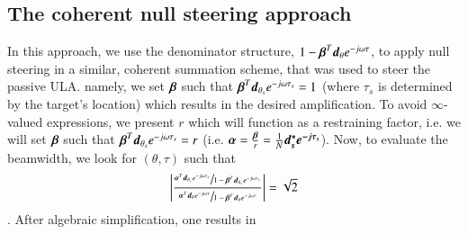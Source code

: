 \subsection{The coherent null steering approach}
In this approach, we use the denominator structure, $ 1 - \boldsymbol{\beta}^{T}\boldsymbol{d}_{\theta}e^{-j\omega\tau} $, to apply null steering in a similar, coherent summation scheme, that was used to steer the passive ULA. namely, we set $ \boldsymbol{\beta} $ such that $ \boldsymbol{\beta}^{T}\boldsymbol{d}_{\theta_{s}}e^{-j\omega\tau_{s}} = 1 $ (where $\tau_{s}$ is determined by the target's location) which results in the desired amplification. To avoid $\infty$-valued expressions, we present $r$ which will function as a restraining factor, i.e. we will set $ \boldsymbol{\beta} $ such that $ \boldsymbol{\beta}^{T}\boldsymbol{d}_{\theta_{s}}e^{-j\omega\tau_{s}} = r $ (i.e. $ \boldsymbol{\alpha} = \frac{\boldsymbol{\beta}}{r} = \frac{1}{N}\boldsymbol{d^{*}_{s}e^{-j\tau_{s}}} $). Now, to evaluate the beamwidth, we look for $\left(\theta,\tau\right)$ such that 
\begin{align}
\label{eqn_arrPerformance_beamwidth_3dB}
\left|
\frac{
\sfrac
{
\vecnot{\alpha}^{T}\vecnot{d}_{\theta_{s}}e^{-j\omega\tau_{s}}
}
{
1-\vecnot{\beta}^{T}\vecnot{d}_{\theta_{s}}e^{-j\omega\tau_{s}}
}
}{
\sfrac
{
\vecnot{\alpha}^{T}\vecnot{d}_{\theta}e^{-j\omega\tau}
}
{
1-\vecnot{\beta}^{T}\vecnot{d}_{\theta}e^{-j\omega\tau}
}
}
\right|
=
\sqrt{2}
\end{align}.
After algebraic simplification, one results in
\ifdefined\showDev
    \\
